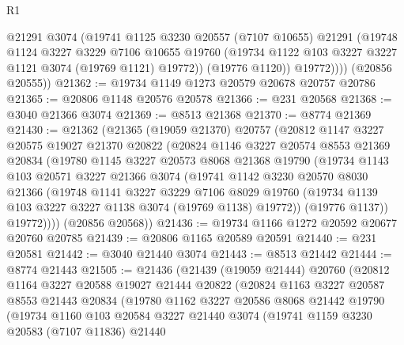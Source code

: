 \begin{lexlean}{R1}
\begin{coremodule}
              @21291
              @3074
              (@19741
                @1125
                @3230
                @20557
                (@7107 @10655)
                @21291
                (@19748
                  @1124
                  @3227
                  @3229
                  @7106
                  @10655
                  @19760
                  (@19734 @1122 @103 @3227 @3227 @1121 @3074 (@19769 @1121) @19772))
                (@19776 @1120))
              @19772))))
      (@20856 @20555))
@21362 := @19734 @1149 @1273 @20579 @20678 @20757 @20786
@21365 := @20806 @1148 @20576 @20578
@21366 := @231 @20568
@21368 := @3040 @21366 @3074
@21369 := @8513 @21368
@21370 := @8774 @21369
@21430 := @21362
    (@21365
      (@19059 @21370)
      @20757
      (@20812
        @1147
        @3227
        @20575
        @19027
        @21370
        @20822
        (@20824
          @1146
          @3227
          @20574
          @8553
          @21369
          @20834
          (@19780
            @1145
            @3227
            @20573
            @8068
            @21368
            @19790
            (@19734
              @1143
              @103
              @20571
              @3227
              @21366
              @3074
              (@19741
                @1142
                @3230
                @20570
                @8030
                @21366
                (@19748
                  @1141
                  @3227
                  @3229
                  @7106
                  @8029
                  @19760
                  (@19734 @1139 @103 @3227 @3227 @1138 @3074 (@19769 @1138) @19772))
                (@19776 @1137))
              @19772))))
      (@20856 @20568))
@21436 := @19734 @1166 @1272 @20592 @20677 @20760 @20785
@21439 := @20806 @1165 @20589 @20591
@21440 := @231 @20581
@21442 := @3040 @21440 @3074
@21443 := @8513 @21442
@21444 := @8774 @21443
@21505 := @21436
    (@21439
      (@19059 @21444)
      @20760
      (@20812
        @1164
        @3227
        @20588
        @19027
        @21444
        @20822
        (@20824
          @1163
          @3227
          @20587
          @8553
          @21443
          @20834
          (@19780
            @1162
            @3227
            @20586
            @8068
            @21442
            @19790
            (@19734
              @1160
              @103
              @20584
              @3227
              @21440
              @3074
              (@19741
                @1159
                @3230
                @20583
                (@7107 @11836)
                @21440

\end{coremodule}
\end{lexlean}
